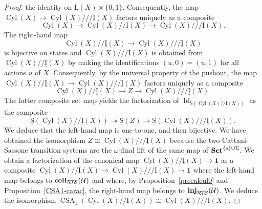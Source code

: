 \documentclass[a4paper,12pt]{amsart}
\begin{document}
\begin{proof}
the identity on $\operatorname{\underline{L}}(X)\times \{0,1\}$.  Consequently, the map $\operatorname{{Cyl}}(X)
\to \operatorname{{Cyl}}(X)/// \operatorname{\underline{I}}(X)$ factors uniquely as a composite \[\operatorname{{Cyl}}(X) \to
\operatorname{{Cyl}}(X)//\operatorname{\underline{I}}(X) \to \operatorname{{Cyl}}(X)/// \operatorname{\underline{I}}(X).\] The right-hand map
\[\operatorname{{Cyl}}(X)//\operatorname{\underline{I}}(X)\to \operatorname{{Cyl}}(X)/// \operatorname{\underline{I}}(X)\] is bijective on states and
$\operatorname{{Cyl}}(X)/// \operatorname{\underline{I}}(X)$ is obtained from $\operatorname{{Cyl}}(X)//\operatorname{\underline{I}}(X)$ by making the
identifications $(u,0)=(u,1)$ for all actions $u$ of
$X$. Consequently, by the universal property of the pushout, the map
$\operatorname{{Cyl}}(X)//\operatorname{\underline{I}}(X)\to \operatorname{{Cyl}}(X)/// \operatorname{\underline{I}}(X)$ factors uniquely as a
composite \[\operatorname{{Cyl}}(X)//\operatorname{\underline{I}}(X)\longrightarrow Z \longrightarrow
\operatorname{{Cyl}}(X)/// \operatorname{\underline{I}}(X).\] The latter composite set map yields the
factorization of $\operatorname{Id}_{\operatorname{\underline{S}}(\operatorname{{Cyl}}(X)//\operatorname{\underline{I}}(X))}$ as the composite
\[\operatorname{\underline{S}}(\operatorname{{Cyl}}(X)//\operatorname{\underline{I}}(X)) \twoheadrightarrow \operatorname{\underline{S}}(Z) \longrightarrow \operatorname{\underline{S}}(\operatorname{{Cyl}}(X)///\operatorname{\underline{I}}(X)).\] We
deduce that the left-hand map is one-to-one, and then bijective. We
have obtained the isomorphism $Z{\cong} \operatorname{{Cyl}}(X)/// \operatorname{\underline{I}}(X)$ because the
two Cattani-Sassone transition systems are the $\omega$-final lift of
the same map of ${{{\rm{\mathbf{{Set}}}}}}^{\{s\}\cup \Sigma}$. We obtain a factorization
of the canonical map $\operatorname{{Cyl}}(X)// \operatorname{\underline{I}}(X) \to \mathbf{1}$ as a composite
$\operatorname{{Cyl}}(X)// \operatorname{\underline{I}}(X) \to \operatorname{{Cyl}}(X)/// \operatorname{\underline{I}}(X)\to \mathbf{1}$ where the
left-hand map belongs to $\operatorname{{{\rm{\mathbf{{cell}}}}}}_{\mathcal{R\!T\!S}}(\mathcal{U})$ and where, by
Proposition~\ref{precalcul0} and Proposition~\ref{CSA1-carac}, the
right-hand map belongs to $\operatorname{{{\rm{\mathbf{{inj}}}}}}_{\mathcal{R\!T\!S}}(\mathcal{U})$. We deduce the
isomorphism $\operatorname{CSA}_1(\operatorname{{Cyl}}(X)// \operatorname{\underline{I}}(X)) {\cong} \operatorname{{Cyl}}(X)/// \operatorname{\underline{I}}(X)$.  \end{proof}
\end{document}
